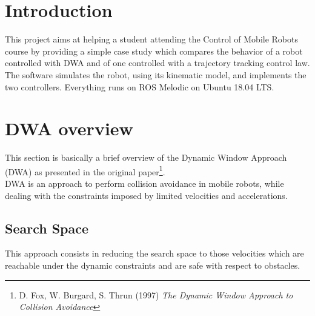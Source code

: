 \documentclass[11pt,a4paper]{article}
\begin{document}


\newpage

\renewcommand*\contentsname{Table of Contents}
\tableofcontents

\newpage




\section{Introduction}

This project aims at helping a student attending the Control of Mobile Robots course by providing a simple case study which compares the behavior of a robot controlled with DWA and of one controlled with a trajectory tracking control law.\\

The software simulates the robot, using its kinematic model, and implements the two controllers. Everything runs on ROS Melodic on Ubuntu 18.04 LTS.




\section{DWA overview}

This section is basically a brief overview of the Dynamic Window Approach (DWA) as presented in the original paper\footnote{D. Fox, W. Burgard, S. Thrun (1997) \textit{The Dynamic Window Approach to Collision Avoidance}}.\\

DWA is an approach to perform collision avoidance in mobile robots, while dealing with the constraints imposed by limited velocities and accelerations.

\subsection{Search Space}

This approach consists in reducing the search space to those velocities which are reachable under the dynamic constraints and are safe with respect to obstacles.
\end{document}
